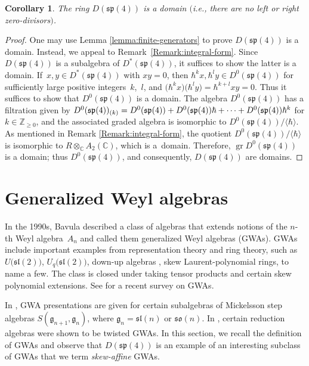 \documentclass[pdftex]{sigma}
\numberwithin{equation}{section}
\newtheorem{Corollary}[Theorem]{Corollary}
\begin{document}
\begin{Corollary}\label{cor:Dsp4-structure:domain}
	The ring $D(\mathfrak{sp}(4))$ is a domain $($i.e., there are no left or right zero-divisors$)$.
\end{Corollary}

\begin{proof}
	One may use Lemma \ref{lemma:finite-generators}
	to prove $D(\mathfrak{sp}(4))$ is a domain.
	Instead, we appeal to Remark~\ref{Remark:integral-form}.
	Since $D(\mathfrak{sp}(4))$ is a subalgebra of $D^\ast(\mathfrak{sp}(4))$, it suffices to show the latter is a domain.
	If~${x,y\in D^\ast(\mathfrak{sp}(4))}$ with $xy=0$, then $\hbar^kx, \hbar^ly \in D^0(\mathfrak{sp}(4))$ for sufficiently large positive integers~$k$,~$l$, and $\bigl(\hbar^kx\bigr)\bigl(\hbar^ly\bigr)=\hbar^{k+l}xy=0$. Thus it suffices to show that $D^0(\mathfrak{sp}(4))$ is a domain.
	The algebra $D^0(\mathfrak{sp}(4))$ has a filtration given by $\smash{D^0(\mathfrak{sp}(4))_{(k)}=D^0(\mathfrak{sp}(4))+D^0(\mathfrak{sp}(4))\hbar}+\cdots+D^0(\mathfrak{sp}(4))\hbar^k$ for $k\in\mathbb{Z}_{\geq 0}$, and the associated graded algebra is isomorphic to $D^0(\mathfrak{sp}(4))/\langle\hbar\rangle$. As mentioned in
	Remark \ref{Remark:integral-form}, the quotient $D^0(\mathfrak{sp}(4))/\langle\hbar\rangle$ is isomorphic to $R\otimes_\mathbb{C} A_2(\mathbb{C})$, which is a~domain. Therefore, $\operatorname{gr}D^0(\mathfrak{sp}(4))$ is a domain; thus $D^0(\mathfrak{sp}(4))$, and consequently, $D(\mathfrak{sp}(4))$ are domains.
\end{proof}


\section{Generalized Weyl algebras}\label{sec:GWA}
In the 1990s, Bavula \cite{bavula1992generalized} described a class of algebras that extends notions of the $n$-th Weyl algebra~$A_{n}$ and called them generalized Weyl algebras (GWAs).
GWAs include important examples from representation theory and ring theory, such as $U\big(\mathfrak{sl}(2)\big)$, $U_q\big(\mathfrak{sl}(2)\big)$, down-up algebras \cite{benkartAlgebras1998}, skew Laurent-polynomial rings, to name a few. The class is closed under taking tensor products and certain skew polynomial extensions.
See \cite{gaddisWeylAlgebraIts2023} for a recent survey on GWAs.

In \cite{van1976harisch}, GWA presentations are given for certain subalgebras of Mickelsson step algebras $S(\mathfrak{g}_{n+1},\mathfrak{g}_n)$, where $\mathfrak{g}_n=\mathfrak{sl}(n)$ or $\mathfrak{so}(n)$. In \cite{mazorchukAssociativeAlgebrasRelated2003}, certain reduction algebras were shown to be twisted GWAs. In this section, we recall the definition of GWAs and observe that $D(\mathfrak{sp}(4))$
is an example of an interesting subclass of GWAs that we term \emph{skew-affine} GWAs.
\end{document}
